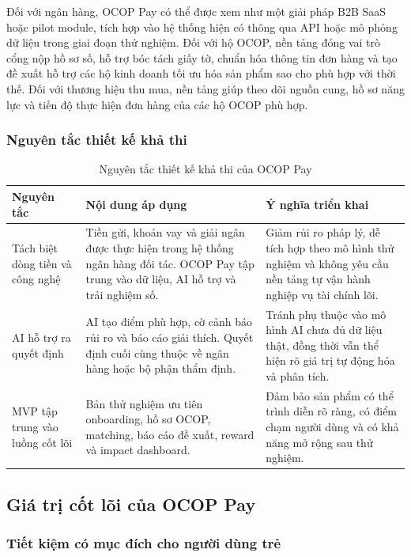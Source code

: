 \documentclass[13pt,a4paper]{extarticle}
\begin{document}
Đối với ngân hàng, OCOP Pay có thể được xem như một giải pháp B2B SaaS hoặc pilot module, tích hợp vào hệ thống hiện có thông qua API hoặc mô phỏng dữ liệu trong giai đoạn thử nghiệm. Đối với hộ OCOP, nền tảng đóng vai trò cổng nộp hồ sơ số, hỗ trợ bóc tách giấy tờ, chuẩn hóa thông tin đơn hàng và tạo đề xuất hỗ trợ các hộ kinh doanh tối ưu hóa sản phẩm sao cho phù hợp với thời thế. Đối với thương hiệu thu mua, nền tảng giúp theo dõi nguồn cung, hồ sơ năng lực và tiến độ thực hiện đơn hàng của các hộ OCOP phù hợp.


\subsubsection{Nguyên tắc thiết kế khả thi}

\begin{table}[H]
\centering
\caption{Nguyên tắc thiết kế khả thi của OCOP Pay}
\begin{tabular}{|p{3.5cm}|p{5cm}|p{5cm}|}
\hline
\textbf{Nguyên tắc} & \textbf{Nội dung áp dụng} & \textbf{Ý nghĩa triển khai} \\
\hline
Tách biệt dòng tiền và công nghệ & Tiền gửi, khoản vay và giải ngân được thực hiện trong hệ thống ngân hàng đối tác. OCOP Pay tập trung vào dữ liệu, AI hỗ trợ và trải nghiệm số. & Giảm rủi ro pháp lý, dễ tích hợp theo mô hình thử nghiệm và không yêu cầu nền tảng tự vận hành nghiệp vụ tài chính lõi. \\
\hline
AI hỗ trợ ra quyết định & AI tạo điểm phù hợp, cờ cảnh báo rủi ro và báo cáo giải thích. Quyết định cuối cùng thuộc về ngân hàng hoặc bộ phận thẩm định. & Tránh phụ thuộc vào mô hình AI chưa đủ dữ liệu thật, đồng thời vẫn thể hiện rõ giá trị tự động hóa và phân tích. \\
\hline
MVP tập trung vào luồng cốt lõi & Bản thử nghiệm ưu tiên onboarding, hồ sơ OCOP, matching, báo cáo đề xuất, reward và impact dashboard. & Đảm bảo sản phẩm có thể trình diễn rõ ràng, có điểm chạm người dùng và có khả năng mở rộng sau thử nghiệm. \\
\hline
\end{tabular}
\end{table}

\subsection{Giá trị cốt lõi của OCOP Pay}

\subsubsection{Tiết kiệm có mục đích cho người dùng trẻ}
\end{document}
